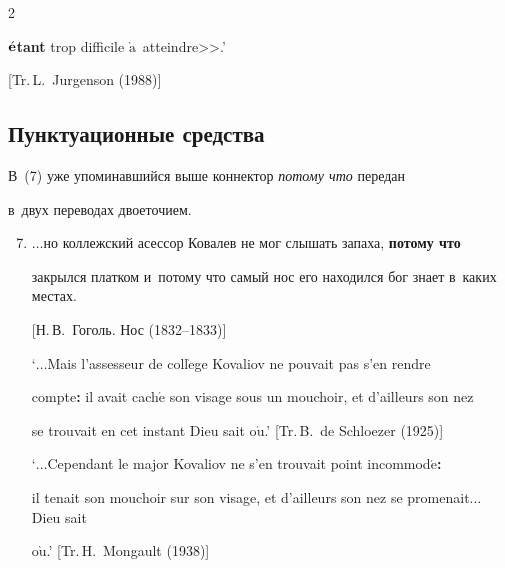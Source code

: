 \begin{multicols}{2}
{\begin{enumerate}[(1)]
$\acute{\mbox{\textbf{e}}}$\textbf{tant} trop difficile $\grave{\mbox{a}}$~atteindre>>.' 


[Tr.\,L.~Jurgenson (1988)]


\end{enumerate}


}





\subsection{Пунктуационные средства}





В~(7) уже упоминавшийся выше коннектор \textit{потому что} передан 


в~двух переводах двоеточием.


{\small


\begin{enumerate}[(1)]


\setcounter{enumi}{6}


\item


$\ldots$но коллежский асессор Ковалев не мог слышать запаха, \textbf{потому что} 


закрылся платком и~потому что самый нос его находился бог знает в~каких местах. 


[Н.\,В.~Гоголь. Нос (1832--1833)]





`$\ldots$Mais l'assesseur de coll$\grave{\mbox{e}}$ge Kovaliov ne pouvait pas s'en rendre 


compte\textbf{:} il avait cach$\acute{\mbox{e}}$ son visage sous un mouchoir, et d'ailleurs son nez 


se trouvait en cet instant Dieu sait o$\grave{\mbox{u}}$.' [Tr.\,B.~de Schloezer (1925)]





`$\ldots$Cependant le major Kovaliov ne s'en trouvait point incommod$\acute{\mbox{e}}$\textbf{:} 


il tenait son mouchoir sur son visage, et d'ailleurs son nez se promenait$\ldots$ Dieu sait 


o$\grave{\mbox{u}}$.' [Tr.\,H.~Mongault (1938)]


\end{enumerate}


}






\end{multicols}
